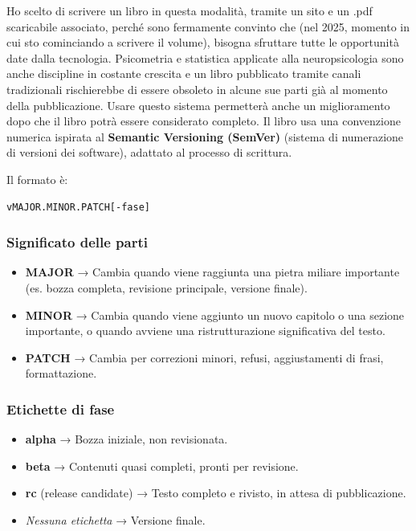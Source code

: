 \documentclass[
  italian,
  letterpaper,
  paper=A4,
  headinclude=on,
  footinclude=on,
  12pt]{scrbook}
\providecommand{\tightlist}{%
  \setlength{\itemsep}{0pt}\setlength{\parskip}{0pt}}
\begin{document}
Ho scelto di scrivere un libro in questa modalità, tramite un sito e un
.pdf scaricabile associato, perché sono fermamente convinto che (nel
2025, momento in cui sto cominciando a scrivere il volume), bisogna
sfruttare tutte le opportunità date dalla tecnologia. Psicometria e
statistica applicate alla neuropsicologia sono anche discipline in
costante crescita e un libro pubblicato tramite canali tradizionali
rischierebbe di essere obsoleto in alcune sue parti già al momento della
pubblicazione. Usare questo sistema permetterà anche un miglioramento
dopo che il libro potrà essere considerato completo. Il libro usa una
convenzione numerica ispirata al \textbf{Semantic Versioning (SemVer)}
(sistema di numerazione di versioni dei software), adattato al processo
di scrittura.

Il formato è:

\begin{verbatim}
vMAJOR.MINOR.PATCH[-fase]
\end{verbatim}

\subsubsection*{Significato delle parti}\label{significato-delle-parti}

\begin{itemize}
\tightlist
\item
  \textbf{MAJOR} → Cambia quando viene raggiunta una pietra miliare
  importante (es. bozza completa, revisione principale, versione
  finale).
\item
  \textbf{MINOR} → Cambia quando viene aggiunto un nuovo capitolo o una
  sezione importante, o quando avviene una ristrutturazione
  significativa del testo.
\item
  \textbf{PATCH} → Cambia per correzioni minori, refusi, aggiustamenti
  di frasi, formattazione.
\end{itemize}

\subsubsection*{Etichette di fase}\label{etichette-di-fase}

\begin{itemize}
\tightlist
\item
  \textbf{alpha} → Bozza iniziale, non revisionata.
\item
  \textbf{beta} → Contenuti quasi completi, pronti per revisione.
\item
  \textbf{rc} (release candidate) → Testo completo e rivisto, in attesa
  di pubblicazione.
\item
  \emph{Nessuna etichetta} → Versione finale.
\end{itemize}
\end{document}
